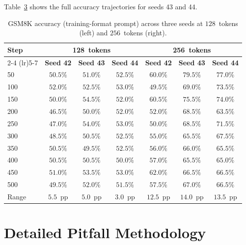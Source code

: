 \documentclass[pdflatex,sn-mathphys-ay,iicol]{sn-jnl}
\theoremstyle{thmstylethree}
\begin{document}
\begin{table}[t]
\begin{table}[t]
Table~\ref{tab:seed_rep} shows the full accuracy trajectories for seeds 43 and 44.

\begin{table}[ht]
\centering
\caption{GSM8K accuracy (training-format prompt) across three seeds at $128$~tokens (left) and $256$~tokens (right).}
\label{tab:seed_rep}
\begin{tabular}{lcccccc}\toprule
\multirow{2}{*}{\textbf{Step}} & \multicolumn{3}{c}{\textbf{128~tokens}} & \multicolumn{3}{c}{\textbf{256~tokens}} \\
\cmidrule(lr){2-4} \cmidrule(lr){5-7}
 & \textbf{Seed 42} & \textbf{Seed 43} & \textbf{Seed 44} & \textbf{Seed 42} & \textbf{Seed 43} & \textbf{Seed 44} \\\midrule
50  & $50.5\%$ & $51.0\%$ & $52.5\%$ & $60.0\%$ & $79.5\%$ & $77.0\%$ \\
100 & $52.0\%$ & $52.5\%$ & $53.0\%$ & $49.5\%$ & $69.0\%$ & $73.5\%$ \\
150 & $50.0\%$ & $54.5\%$ & $52.0\%$ & $60.5\%$ & $75.5\%$ & $74.0\%$ \\
200 & $46.5\%$ & $50.0\%$ & $52.0\%$ & $52.0\%$ & $68.5\%$ & $63.5\%$ \\
250 & $47.0\%$ & $54.0\%$ & $53.0\%$ & $50.0\%$ & $68.5\%$ & $71.5\%$ \\
300 & $48.5\%$ & $50.5\%$ & $52.5\%$ & $55.0\%$ & $65.5\%$ & $67.5\%$ \\
350 & $50.5\%$ & $49.5\%$ & $52.5\%$ & $56.0\%$ & $66.0\%$ & $65.5\%$ \\
400 & $50.5\%$ & $50.5\%$ & $50.0\%$ & $57.0\%$ & $65.5\%$ & $65.0\%$ \\
450 & $51.0\%$ & $53.5\%$ & $53.0\%$ & $62.0\%$ & $66.5\%$ & $66.5\%$ \\
500 & $49.5\%$ & $52.0\%$ & $51.5\%$ & $57.5\%$ & $67.0\%$ & $66.5\%$ \\\midrule
Range & $5.5$~pp & $5.0$~pp & $3.0$~pp & $12.5$~pp & $14.0$~pp & $13.5$~pp \\\bottomrule
\end{tabular}
\end{table}

\section{Detailed Pitfall Methodology}\label{app:pitfall_details}


\end{table}
\end{table}
\end{document}
